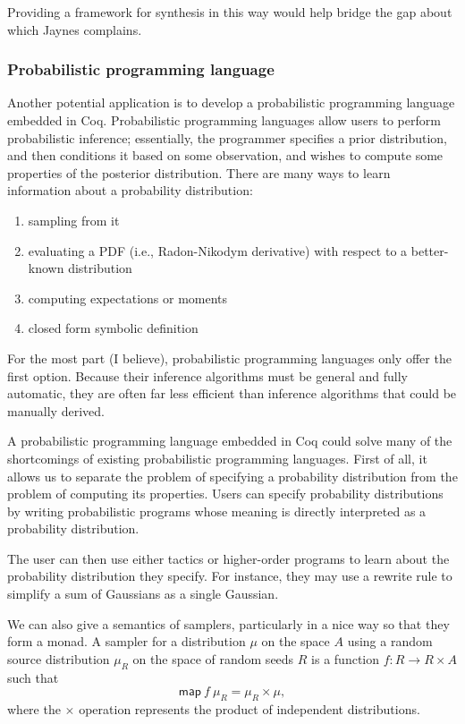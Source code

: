 Providing a framework for synthesis in this way would help bridge the gap about which Jaynes complains.

\subsubsection{Probabilistic programming language}

Another potential application is to develop a probabilistic programming language embedded in Coq. Probabilistic programming languages allow users to perform probabilistic inference; essentially, the programmer specifies a prior distribution, and then conditions it based on some observation, and wishes to compute some properties of the posterior distribution. There are many ways to learn information about a probability distribution:

\begin{enumerate}
\item sampling from it
\item evaluating a PDF (i.e., Radon-Nikodym derivative) with respect to a better-known distribution
\item computing expectations or moments
\item closed form symbolic definition
\end{enumerate}

For the most part (I believe), probabilistic programming languages only offer the first option. Because their inference algorithms must be general and fully automatic, they are often far less efficient than inference algorithms that could be manually derived.

A probabilistic programming language embedded in Coq could solve many of the shortcomings of existing probabilistic programming languages. First of all, it allows us to separate the problem of specifying a probability distribution from the problem of computing its properties. Users can specify probability distributions by writing probabilistic programs whose meaning is directly interpreted as a probability distribution.

The user can then use either tactics or higher-order programs to learn about the probability distribution they specify. For instance, they may use a rewrite rule to simplify a sum of Gaussians as a single Gaussian.

We can also give a semantics of samplers, particularly in a nice way so that they form a monad. A sampler for a distribution $\mu$ on the space $A$ using a random source distribution $\mu_R$ on the space of random seeds $R$ is a function $ f : R \to R \times A$ such that
\[
  \mathsf{map}\ f \ \mu_R = \mu_R \times \mu,
\]
where the $\times$ operation represents the product of independent distributions.


